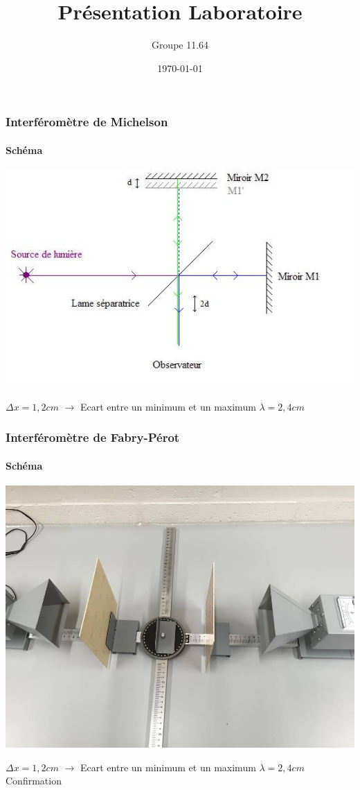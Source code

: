 \documentclass{beamer}
\begin{document}
\title[Présentation]{Présentation Laboratoire}

\subtitle[\ldots]{}
\author{Groupe 11.64}
\date{\today}
\maketitle

\begin{frame}
\frametitle{Interféromètre de Michelson}
\framesubtitle{Schéma}
\includegraphics[scale=0.5]{schema.jpg}

$\Delta x = 1,2 cm$ $\rightarrow$  Ecart entre un minimum et un maximum 
$\lambda = 2,4 cm$


\end{frame} 

\begin{frame}
\frametitle{Interféromètre de Fabry-Pérot}
\framesubtitle{Schéma}
\includegraphics[scale=0.25]{schema1.jpg}

$\Delta x = 1,2 cm$ $\rightarrow$  Ecart entre un minimum et un maximum 
$\lambda = 2,4 cm$\\
Confirmation


\end{frame} 
\end{document}
